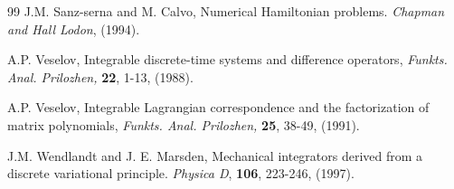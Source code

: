 \documentclass[a4paper,a4paper]{article}
\begin{document}
\begin{thebibliography} {99}
\label{s1}
J.M. Sanz-serna and M. Calvo, Numerical Hamiltonian problems. {\em
Chapman and Hall Lodon}, (1994).

\label{v1}
A.P. Veselov, Integrable discrete-time systems and difference operators, {\em
Funkts. Anal. Prilozhen,} {\bf 22}, 1-13, (1988).

\label{v2}
A.P. Veselov, Integrable Lagrangian correspondence and the factorization of
matrix polynomials,  {\em Funkts. Anal. Prilozhen,} {\bf 25}, 38-49, (1991).

\label{w1}
J.M. Wendlandt and J. E. Marsden, Mechanical integrators derived from a discrete
variational principle. {\em Physica D}, {\bf 106}, 223-246, (1997).

 
\end{thebibliography}
\end{document}
